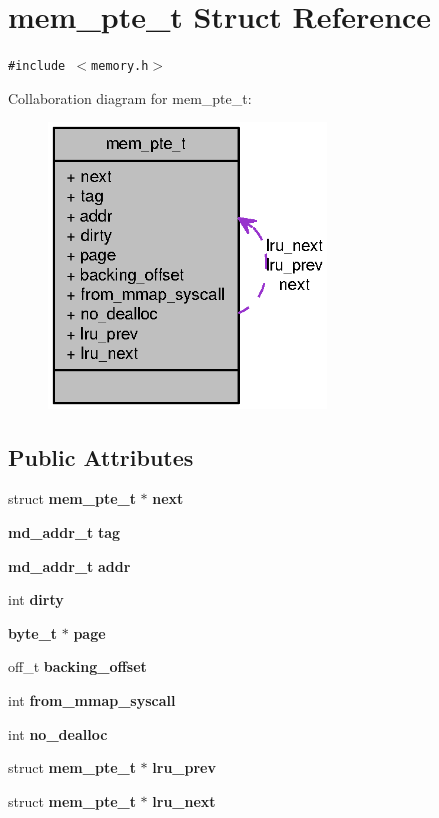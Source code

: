 \section{mem\_\-pte\_\-t Struct Reference}
\label{structmem__pte__t}
{\tt \#include $<$memory.h$>$}

Collaboration diagram for mem\_\-pte\_\-t:\nopagebreak
\begin{figure}[H]
\begin{center}
\leavevmode
\includegraphics[width=209pt]{structmem__pte__t__coll__graph}
\end{center}
\end{figure}
\subsection*{Public Attributes}
\begin{CompactItemize}
\item 
struct {\bf mem\_\-pte\_\-t} $\ast$ {\bf next}
\item 
{\bf md\_\-addr\_\-t} {\bf tag}
\item 
{\bf md\_\-addr\_\-t} {\bf addr}
\item 
int {\bf dirty}
\item 
{\bf byte\_\-t} $\ast$ {\bf page}
\item 
off\_\-t {\bf backing\_\-offset}
\item 
int {\bf from\_\-mmap\_\-syscall}
\item 
int {\bf no\_\-dealloc}
\item 
struct {\bf mem\_\-pte\_\-t} $\ast$ {\bf lru\_\-prev}
\item 
struct {\bf mem\_\-pte\_\-t} $\ast$ {\bf lru\_\-next}
\end{CompactItemize}


